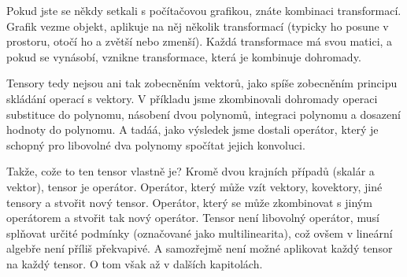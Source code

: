 \documentclass[a5paper,12pt]{amsbook}
\theoremstyle{definition}
\begin{document}
Pokud jste se někdy setkali s počítačovou grafikou, znáte kombinaci transformací. Grafik vezme objekt,
aplikuje na něj několik transformací (typicky ho posune v prostoru, otočí ho a zvětší nebo zmenší).
Každá transformace má svou matici, a pokud se vynásobí, vznikne transformace, která je kombinuje
dohromady.

Tensory tedy nejsou ani tak zobecněním vektorů, jako spíše zobecněním principu skládání operací s vektory.
V příkladu jsme zkombinovali dohromady operaci substituce do polynomu, násobení dvou polynomů, integraci
polynomu a dosazení hodnoty do polynomu. A tadáá, jako výsledek jsme dostali operátor, který je schopný
pro libovolné dva polynomy spočítat jejich konvoluci.

Takže, cože to ten tensor vlastně je? Kromě dvou krajních případů (skalár a vektor), tensor je operátor.
Operátor, který může vzít vektory, kovektory, jiné tensory a stvořit nový tensor. Operátor, který se může
zkombinovat s jiným operátorem a stvořit tak nový operátor. Tensor není libovolný operátor, musí splňovat
určité podmínky (označované jako multilinearita), což ovšem v lineární algebře není příliš překvapivé.
A samozřejmě není možné aplikovat každý tensor na každý tensor. O tom však až v dalších kapitolách.
\end{document}
